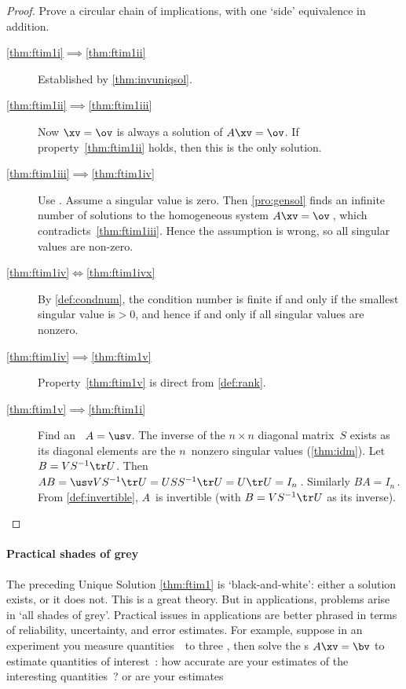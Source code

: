 \begin{proof} 
Prove a circular chain of implications, with one `side' equivalence in addition. 
\begin{description}
\item[\ref{thm:ftim1i}$\implies$\ref{thm:ftim1ii}]
Established by \cref{thm:invuniqsol}.
\item[\ref{thm:ftim1ii}$\implies$\ref{thm:ftim1iii}]
Now \(\xv=\ov\) is always a solution of \(A\xv=\ov\).  If property~\ref{thm:ftim1ii} holds, then this is the only solution.
\item[\ref{thm:ftim1iii}$\implies$\ref{thm:ftim1iv}]
Use .  
Assume a singular value is zero. 
Then \cref{pro:gensol} finds an infinite number of solutions to the homogeneous system \(A\xv=\ov\)\,, which contradicts~\ref{thm:ftim1iii}.
Hence the assumption is wrong, so all singular values are non-zero.
\item[\ref{thm:ftim1iv}$\iff$\ref{thm:ftim1ivx}]
By \cref{def:condnum}, the condition number is finite if and only if the smallest singular value is\({}>0\), and hence if and only if all singular values are nonzero.
\item[\ref{thm:ftim1iv}$\implies$\ref{thm:ftim1v}]
Property~\ref{thm:ftim1v} is direct from \cref{def:rank}.
\item[\ref{thm:ftim1v}$\implies$\ref{thm:ftim1i}]
Find an \svd\ \(A=\usv\).  
The inverse of the \(n\times n\) diagonal matrix~\(S\) exists as its diagonal elements are the \(n\)~nonzero singular values (\cref{thm:idm}). 
Let \(B=VS^{-1}\tr U\).
Then \(AB=\usv VS^{-1}\tr U=USS^{-1}\tr U=U\tr U=I_n\)\,.  
Similarly \(BA=I_n\)\,.  
From \cref{def:invertible}, \(A\)~is invertible (with \(B=VS^{-1}\tr U\) as its inverse).
\end{description}
\end{proof}



\paragraph{Practical shades of grey}
The preceding Unique Solution \cref{thm:ftim1} is `black-and-white': either a solution exists, or it does not.
This is a great theory.
But in applications, problems arise in `all shades of grey'.
Practical issues in applications are better phrased in terms of reliability, uncertainty, and error estimates.
For example, suppose in an experiment you measure quantities~\bv\ to three , then solve the s \(A\xv=\bv\) to estimate quantities of interest~\xv: how accurate are your estimates of the interesting quantities~\xv? or are your estimates 

